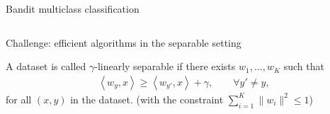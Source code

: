 \documentclass{beamer}
\newcommand{\ip}[2]{\left\langle #1, #2 \right\rangle} %
\begin{document}
\begin{frame}{Bandit multiclass classification}
\begin{minipage}{0.35\textwidth}
\begin{columns}
\begin{column}{0.35\textwidth}
\end{column}
\end{columns}
\end{minipage}

\end{frame}

\begin{frame}{Challenge: efficient algorithms in the separable setting}

\begin{definition}
A dataset is called $\gamma$-linearly separable
if there exists $w_1, \ldots, w_K$ such that
\begin{align*}
\ip{w_{y}}{x} \ge \ip{w_{y'}}{x} + \gamma, \qquad \forall y' \neq y,
\end{align*}
for all $(x,y)$ in the dataset. (with the constraint $\sum_{i=1}^K \|w_i\|^2\leq 1$)
\end{definition}



\end{frame}
\end{document}
